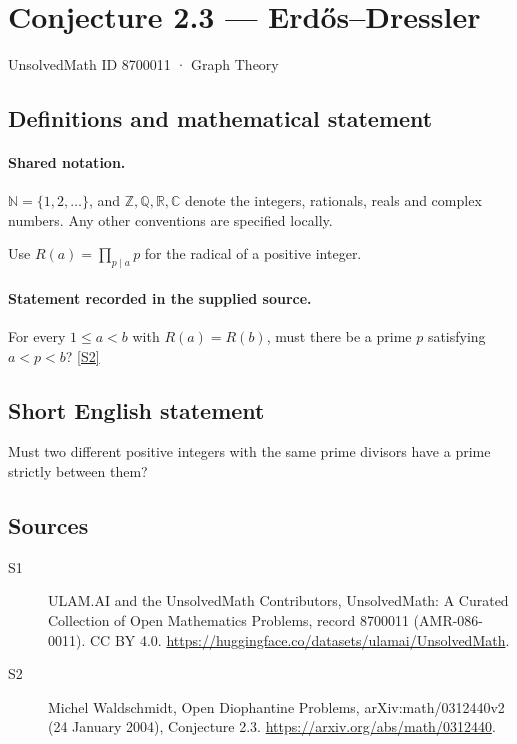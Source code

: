 \documentclass[11pt]{article}
\newcommand{\sref}[2]{\hyperlink{source:#1:#2}{[S#2]}}
\begin{document}
\setcounter{section}{8700010}
\section{Conjecture 2.3 — Erdős–Dressler}\label{8700011}
{\small\sffamily UnsolvedMath ID 8700011 · Graph Theory}
\subsection{Definitions and mathematical statement}

\paragraph{Shared notation.}$\mathbb N=\{1,2,\ldots\}$, and $\mathbb Z,\mathbb Q,\mathbb R,\mathbb C$ denote the integers, rationals, reals and complex numbers. Any other conventions are specified locally.


Use $R(a)=\prod_{p\mid a}p$ for the radical of a positive integer.
\paragraph{Statement recorded in the supplied source.}
For every $1\le a<b$ with $R(a)=R(b)$, must there be a prime $p$ satisfying $a<p<b$? \sref{8700011}{2}
\subsection{Short English statement}
Must two different positive integers with the same prime divisors have a prime strictly between them?
\subsection{Sources}
\begin{description}
\item[\hypertarget{source:8700011:1}{S1}] ULAM.AI and the UnsolvedMath Contributors, UnsolvedMath: A Curated Collection of Open Mathematics Problems, record 8700011 (AMR-086-0011). CC BY 4.0. \url{https://huggingface.co/datasets/ulamai/UnsolvedMath}.
\item[\hypertarget{source:8700011:2}{S2}] Michel Waldschmidt, Open Diophantine Problems, arXiv:math/0312440v2 (24 January 2004), Conjecture 2.3. \url{https://arxiv.org/abs/math/0312440}.
\end{description}
\label{end:8700011}
\end{document}
